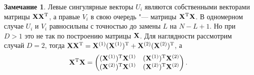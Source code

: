 \documentclass[specialist,
substylefile = spbu_report.rtx,
subf,href,colorlinks=true, 12pt]{disser}
\theoremstyle{definition}
\newtheorem{remark}{Замечание}
\begin{document}
\begin{remark}\label{remark:svd}
	Левые сингулярные векторы $U_i$ являются собственными векторами матрицы $\mathbf{X}\mathbf{X}^{\mathrm{T}}$, а правые $V_i$ в свою очередь "--- матрицы $\mathbf{X}^{\mathrm{T}}\mathbf{X}$. В одномерном случае $U_i$ и $V_i$ равносильны с точностью до замены $L$ на $N-L+1$. Но при $D>1$ это не так по построению матрицы $\mathbf{X}$. Для наглядности рассмотрим случай $D=2$, тогда $\mathbf{X}\mathbf{X}^{\mathrm{T}}=\mathbf{X}^{(1)}(\mathbf{X}^{(1)})^{\mathrm{T}} + \mathbf{X}^{(2)}(\mathbf{X}^{(2)})^{\mathrm{T}}$, а
	\[
		\mathbf{X}^{\mathrm{T}}\mathbf{X}=
		\begin{pmatrix}
			(\mathbf{X}^{(1)})^{\mathrm{T}}\mathbf{X}^{(1)} & (\mathbf{X}^{(1)})^{\mathrm{T}}\mathbf{X}^{(2)} \\
			(\mathbf{X}^{(2)})^{\mathrm{T}}\mathbf{X}^{(1)} & (\mathbf{X}^{(2)})^{\mathrm{T}}\mathbf{X}^{(2)}
		\end{pmatrix}.
	\]
\end{remark}
\end{document}
